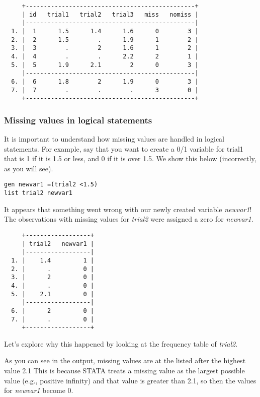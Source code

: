 \begin{lstlisting}
     +-----------------------------------------------+
     | id   trial1   trial2   trial3   miss   nomiss |
     |-----------------------------------------------|
  1. |  1      1.5      1.4      1.6      0        3 |
  2. |  2      1.5        .      1.9      1        2 |
  3. |  3        .        2      1.6      1        2 |
  4. |  4        .        .      2.2      2        1 |
  5. |  5      1.9      2.1        2      0        3 |
     |-----------------------------------------------|
  6. |  6      1.8        2      1.9      0        3 |
  7. |  7        .        .        .      3        0 |
     +-----------------------------------------------+
\end{lstlisting}

\subsubsection{Missing values in logical statements}

It is important to understand how missing values are handled in logical statements.  For example, say that you want to create a 0/1 variable for trial1 that is 1 if it is 1.5 or less, and 0 if it is over 1.5. We show this below (incorrectly, as you will see).

\begin{lstlisting}
gen newvar1 =(trial2 <1.5)
list trial2 newvar1
\end{lstlisting}

It appears that something went wrong with our newly created variable \textit{newvar1}!  The observations with missing values for \textit{trial2} were assigned a zero for \textit{newvar1}.

\begin{lstlisting}
     +------------------+
     | trial2   newvar1 |
     |------------------|
  1. |    1.4         1 |
  2. |      .         0 |
  3. |      2         0 |
  4. |      .         0 |
  5. |    2.1         0 |
     |------------------|
  6. |      2         0 |
  7. |      .         0 |
     +------------------+
\end{lstlisting}

Let's explore why this happened by looking at the frequency table of \textit{trial2}.

As you can see in the output, missing values are at the listed after the highest value 2.1 This is because STATA treats a missing value as the largest possible value (e.g., positive infinity) and that value is greater than 2.1, so then the values for \textit{newvar1} become 0.

